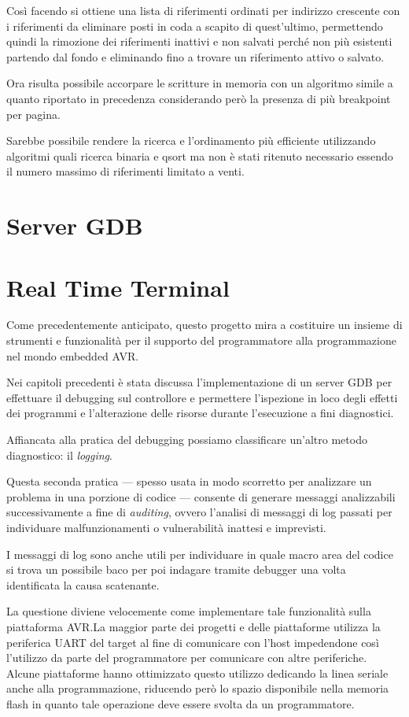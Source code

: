 Così facendo si ottiene una lista di riferimenti ordinati per indirizzo crescente con i riferimenti da eliminare posti in coda a scapito di quest'ultimo, permettendo quindi la rimozione dei riferimenti inattivi e non salvati perché non più esistenti partendo dal fondo e eliminando fino a trovare un riferimento attivo o salvato.

Ora risulta possibile accorpare le scritture in memoria con un algoritmo simile a quanto riportato in precedenza considerando però la presenza di più breakpoint per pagina.

Sarebbe possibile rendere la ricerca e l'ordinamento più efficiente utilizzando algoritmi quali ricerca binaria e qsort ma non è stati ritenuto necessario essendo il numero massimo di riferimenti limitato a venti.

\section{Server GDB}

\section{Real Time Terminal}

Come precedentemente anticipato, questo progetto mira a costituire un insieme di strumenti e funzionalità per il supporto del programmatore alla programmazione nel mondo embedded AVR.\@

Nei capitoli precedenti è stata discussa l'implementazione di un server GDB per effettuare il debugging sul controllore e permettere l'ispezione in loco degli effetti dei programmi e l'alterazione delle risorse durante l'esecuzione a fini diagnostici. 

Affiancata alla pratica del debugging possiamo classificare un'altro metodo diagnostico: il \textit{logging}.

Questa seconda pratica --- spesso usata in modo scorretto per analizzare un problema in una porzione di codice --- consente di generare messaggi analizzabili successivamente a fine di \textit{auditing}, ovvero l'analisi di messaggi di log passati per individuare malfunzionamenti o vulnerabilità inattesi e imprevisti.

I messaggi di log sono anche utili per individuare in quale macro area del codice si trova un possibile baco per poi indagare tramite debugger una volta identificata la causa scatenante.

La questione diviene velocemente come implementare tale funzionalità sulla piattaforma AVR.\@ La maggior parte dei progetti e delle piattaforme utilizza la periferica UART del target al fine di comunicare con l'host impedendone così l'utilizzo da parte del programmatore per comunicare con altre periferiche. Alcune piattaforme hanno ottimizzato questo utilizzo dedicando la linea seriale anche alla programmazione, riducendo però lo spazio disponibile nella memoria flash in quanto tale operazione deve essere svolta da un programmatore. 